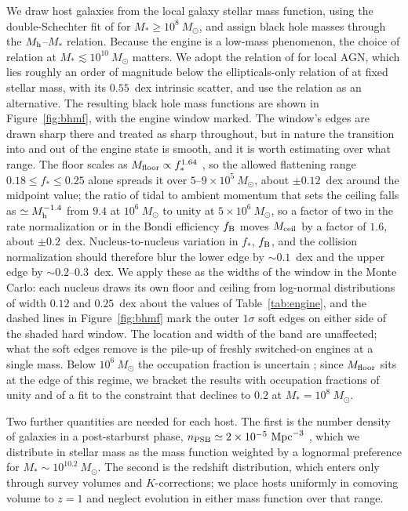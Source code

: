 \documentclass[twocolumn,pdftex]{aastex701}
\newcommand{\msun}{M_{\odot}\xspace}
\begin{document}
We draw host galaxies from the local galaxy stellar mass function, using the double-Schechter fit of \citet{Baldry:2012a} for $M_{\ast} \geq 10^{8}~\msun$, and assign black hole masses through the $M_{\rm h}$--$M_{\ast}$ relation. Because the engine is a low-mass phenomenon, the choice of relation at $M_{\ast} \lesssim 10^{10}~\msun$ matters. We adopt the relation of \citet{Reines:2015a} for local AGN, which lies roughly an order of magnitude below the ellipticals-only relation of \citet{Kormendy:2013a} at fixed stellar mass, with its $0.55$~dex intrinsic scatter, and use the \citet{Kormendy:2013a} relation as an alternative. The resulting black hole mass functions are shown in Figure~\ref{fig:bhmf}, with the engine window marked. The window's edges are drawn sharp there and treated as sharp throughout, but in nature the transition into and out of the engine state is smooth, and it is worth estimating over what range. The floor scales as $M_{\rm floor} \propto f_{\ast}^{1.64}$ \citep{Guillochon:2026a}, so the allowed flattening range $0.18 \le f_{\ast} \le 0.25$ alone spreads it over $5$--$9 \times 10^{5}~\msun$, about $\pm 0.12$~dex around the midpoint value; the ratio of tidal to ambient momentum that sets the ceiling falls as $\simeq M_{\rm h}^{-1.4}$ from $9.4$ at $10^{6}~\msun$ to unity at $5 \times 10^{6}~\msun$, so a factor of two in the rate normalization or in the Bondi efficiency $f_{\rm B}$ moves $M_{\rm ceil}$ by a factor of $1.6$, about $\pm 0.2$~dex. Nucleus-to-nucleus variation in $f_{\ast}$, $f_{\rm B}$, and the collision normalization should therefore blur the lower edge by $\sim 0.1$~dex and the upper edge by $\sim 0.2$--$0.3$~dex. We apply these as the widths of the window in the Monte Carlo: each nucleus draws its own floor and ceiling from log-normal distributions of width $0.12$ and $0.25$~dex about the values of Table~\ref{tab:engine}, and the dashed lines in Figure~\ref{fig:bhmf} mark the outer $1\sigma$ soft edges on either side of the shaded hard window. The location and width of the band are unaffected; what the soft edges remove is the pile-up of freshly switched-on engines at a single mass. Below $10^{6}~\msun$ the occupation fraction is uncertain \citep{Miller:2015a,Greene:2020a}; since $M_{\rm floor}$ sits at the edge of this regime, we bracket the results with occupation fractions of unity and of a fit to the \citet{Miller:2015a} constraint that declines to $0.2$ at $M_{\ast} = 10^{8}~\msun$.

Two further quantities are needed for each host. The first is the number density of galaxies in a post-starburst phase, $n_{\rm PSB} \simeq 2 \times 10^{-5}~{\rm Mpc}^{-3}$ \citep{French:2018a,Pattarakijwanich:2016a}, which we distribute in stellar mass as the mass function weighted by a lognormal preference for $M_{\ast} \sim 10^{10.2}~\msun$. The second is the redshift distribution, which enters only through survey volumes and $K$-corrections; we place hosts uniformly in comoving volume to $z = 1$ and neglect evolution in either mass function over that range.
\end{document}
